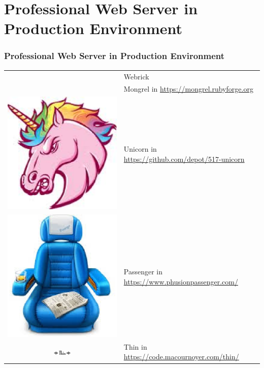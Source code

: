 \documentclass{beamer}
\begin{document}
\section{Professional Web Server in Production Environment}
\begin{frame}[fragile]
\frametitle{Professional Web Server in Production Environment}

\begin{tabular}{cl}
 & Webrick \\
 & Mongrel in \href{https://mongrel.rubyforge.org}{https://mongrel.rubyforge.org}\\
\includegraphics[width=0.15 \textwidth]{unicorn.eps} & Unicorn in \href{https://github.com/depot/517-unicorn}{https://github.com/depot/517-unicorn} \\ 
\includegraphics[width=0.15 \textwidth]{passenger.eps} & Passenger in \href{https://www.phusionpassenger.com/}{https://www.phusionpassenger.com/} \\ 
\includegraphics[width=0.15\textwidth]{thin.eps}  & Thin in \href{https://code.macournoyer.com/thin/}{https://code.macournoyer.com/thin/} \\ 
\end{tabular}


\end{frame}
\end{document}

